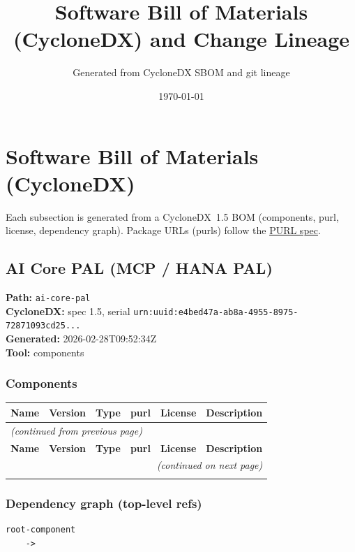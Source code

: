 \documentclass[11pt,a4paper]{article}
\title{\textbf{Software Bill of Materials (CycloneDX) and Change Lineage}}
\author{Generated from CycloneDX SBOM and git lineage}
\date{\today}
\begin{document}
\maketitle
\tableofcontents
\newpage
\section{Software Bill of Materials (CycloneDX)}
Each subsection is generated from a CycloneDX~1.5 BOM (components, purl, license, dependency graph). Package URLs (purls) follow the \href{https://github.com/package-url/purl-spec}{PURL spec}.

\subsection{AI Core PAL (MCP / HANA PAL)}
\textbf{Path:} \texttt{ai-core-pal}
\\ \textbf{CycloneDX:} spec 1.5, serial \texttt{urn:uuid:e4bed47a-ab8a-4955-8975-72871093cd25...}
\\ \textbf{Generated:} 2026-02-28T09:52:34Z
\\ \textbf{Tool:} components

\subsubsection*{Components}
\begin{longtable}{|p{4cm}|p{2cm}|p{1.6cm}|p{5cm}|p{1.5cm}|p{3.5cm}|}
\toprule
\rowcolor{sbomhdr}\textbf{Name} & \textbf{Version} & \textbf{Type} & \textbf{purl} & \textbf{License} & \textbf{Description} \\
\midrule
\endfirsthead
\multicolumn{6}{l}{\small\itshape (continued from previous page)} \\
\toprule
\rowcolor{sbomhdr}\textbf{Name} & \textbf{Version} & \textbf{Type} & \textbf{purl} & \textbf{License} & \textbf{Description} \\
\midrule
\endhead
\midrule
\multicolumn{6}{r}{\small\itshape (continued on next page)} \\
\endfoot
\bottomrule
\endlastfoot
\end{longtable}

\subsubsection*{Dependency graph (top-level refs)}
\begin{lstlisting}[style=depgraph]
  root-component
    -> 
\end{lstlisting}
\end{document}

